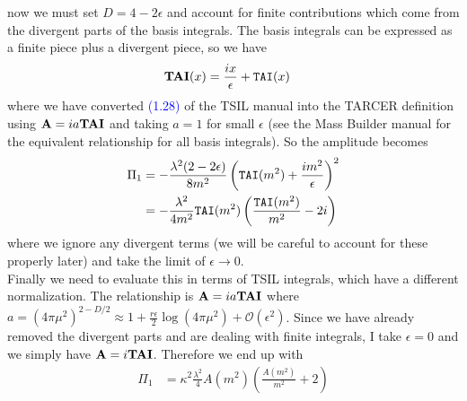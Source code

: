 \documentclass[11pt]{article}
\newcommand{\mb}{\textsf{Mass Builder} }
\newcommand{\tsil}{\textsf{TSIL} }
\newcommand{\tarcer}{\textsf{TARCER} }
\begin{document}
now we must set $D=4-2\epsilon$ and account for finite contributions which come from the divergent parts of the basis integrals.  The basis integrals can be expressed as a finite piece plus a divergent piece, so we have
\begin{align}
{\tt{\mathbf{TAI}}}(x) &= \frac{ix}{\epsilon} +  {\tt{TAI}}(x)
\end{align}
where we have converted \textcolor{blue}{(1.28)} of the \tsil manual \cite{Martin2006} into the \tarcer definition using $\mathbf{A}= ia \tt{\mathbf{TAI}}$ and taking $a=1$ for small $\epsilon$ (see the \mb manual for the equivalent relationship for all basis integrals).  So the amplitude becomes
\begin{align*}
\Pi_1 &=- \frac{\lambda^2(2-2\epsilon)}{8 m^2 }       \left( {\tt{TAI}}(m^2) +\frac{im^2}{\epsilon}\right)^2  \\
&=- \frac{\lambda^2}{4 m^2 }  {\tt{TAI}}(m^2) \left( \frac{ {\tt{TAI}}(m^2) } {m^2} - 2i\right)
\end{align*}
where we ignore any divergent terms (we will be careful to account for these properly later) and take the limit of $\epsilon\rightarrow 0$.\\

Finally we need to evaluate this in terms of \tsil integrals, which have a different normalization.  The relationship is $\mathbf{A}= ia \tt{\mathbf{TAI}}$ where $a = (4\pi\mu^2)^{2-D/2} \approx 1 +\frac{r\epsilon}{2}\log(4\pi\mu^2)+\mathcal{O}(\epsilon^2)$.  Since we have already removed the divergent parts and are dealing with finite integrals, I take $\epsilon =  0$ and we simply have $\mathbf{A}= i \tt{\mathbf{TAI}}$.  Therefore we end up with
\begin{align}
\Pi_1 & = \kappa^2  \frac{\lambda^2}{4 } A(m^2) \left( \frac{A(m^2)}{m^2} + 2 \right)
\end{align}
\end{document}
